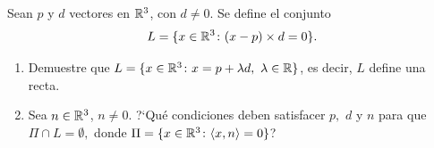 \documentclass[10pt,respuestas,a4]{examenEPN}
\begin{document}
\encabezado

\begin{preguntas}

\item Sean $p$ y $d$ vectores en $\mathbb{R}^3$, con $d\not=0$. Se define el conjunto 
\begin{equation}\label{eq:L}
L=\{x\in\mathbb{R}^3\colon (x-p)\times d = 0\}.
\end{equation}
\begin{enumerate}
    \item Demuestre que $L=\{x\in\mathbb{R}^3\colon x=p+\lambda d,\ \lambda\in\mathbb{R}\}$, es decir, $L$ define una recta. 
    \item Sea $n\in\mathbb{R}^3$, $n\not=0.$ ?`Qu\'e condiciones deben satisfacer $p,$ $d$ y $n$ para que  $\Pi\cap L=\emptyset,$ donde $\Pi =\{x\in\mathbb{R}^3\colon \langle x, n\rangle = 0\}$?
\end{enumerate}

\final
 \end{preguntas}
\end{document}
